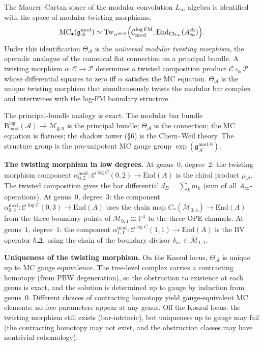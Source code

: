 \documentclass[11pt,reqno]{amsart}
\theoremstyle{definition}
\theoremstyle{remark}
\providecommand{\cA}{\mathcal{A}}
\providecommand{\cC}{\mathcal{C}}
\providecommand{\cM}{\mathcal{M}}
\providecommand{\cP}{\mathcal{P}}
\providecommand{\FM}{\overline{C}}
\providecommand{\gAmod}{\mathfrak{g}^{\mathrm{mod}}_\cA}
\providecommand{\bP}{\mathbb{P}}
\providecommand{\End}{\mathrm{End}}
\numberwithin{equation}{section}
\begin{document}
The Maurer--Cartan space of the modular convolution $L_\infty$
algebra is identified with the space of modular twisting morphisms,
\[
\operatorname{MC}_\bullet(\gAmod)\simeq\operatorname{Tw}_{\alpha^{\mathrm{mod}}}\Bigl(\cC^{\log\mathrm{FM}}_{\mathrm{mod}},\operatorname{End}_{\mathrm{Ch}_\infty}(A^{\mathrm{ch}}_\infty)\Bigr).
\]
Under this identification $\Theta_\cA$ is the \emph{universal modular
twisting morphism}, the operadic analogue of the canonical flat
connection on a principal bundle. A twisting morphism
$\alpha\colon\cC\to\cP$ determines a twisted composition product
$\cC\circ_\alpha\cP$ whose differential squares to zero iff $\alpha$
satisfies the MC equation. $\Theta_\cA$ is the unique twisting
morphism that simultaneously twists the modular bar complex and
intertwines with the log-FM boundary structure.

The principal-bundle analogy is exact. The modular bar bundle
$\mathrm B^{\log}_{\mathrm{mod}}(\cA)\to\overline{\cM}_{g,n}$ is the
principal bundle; $\Theta_\cA$ is the connection; the MC equation is
flatness; the shadow tower (\S6) is the Chern--Weil theory. The
structure group is the pro-unipotent MC gauge group
$\exp(\mathfrak g^{\mathrm{mod},0}_\cA)$.

\medskip
\noindent\textbf{The twisting morphism in low degrees.}\enspace
At genus~$0$, degree~$2$: the twisting morphism component
$\alpha^{\mathrm{mod}}_{0,2}\colon\cC^{\log\FM}(0,2)\to\End(A)$ is the
chiral product $\mu_\cA$. The twisted composition gives the
bar differential $d_B=\sum_k m_k$ (sum of all $A_\infty$-operations).
At genus~$0$, degree~$3$: the component
$\alpha^{\mathrm{mod}}_{0,3}\colon\cC^{\log\FM}(0,3)\to\End(A)$ uses
the chain map $C_*(\overline{\cM}_{0,4})\to\End(A)$ from the three
boundary points of $\overline{\cM}_{0,4}\cong\bP^1$ to the three OPE
channels. At genus~$1$, degree~$1$: the component
$\alpha^{\mathrm{mod}}_{1,1}\colon\cC^{\log\FM}(1,1)\to\End(A)$ is the
BV operator $\hbar\Delta$, using the chain of the boundary divisor
$\delta_{\mathrm{irr}}\in\overline{\cM}_{1,1}$.

\medskip
\noindent\textbf{Uniqueness of the twisting morphism.}\enspace
On the Koszul locus, $\Theta_\cA$ is unique up to MC gauge
equivalence. The tree-level complex carries a contracting homotopy
(from PBW degeneration), so the obstruction to existence at each
genus is exact, and the solution is determined up to gauge by
induction from genus~$0$. Different choices of contracting homotopy
yield gauge-equivalent MC elements; no free parameters appear at
any genus. Off the Koszul locus: the twisting morphism still exists
(bar-intrinsic), but uniqueness up to gauge may fail (the
contracting homotopy may not exist, and the obstruction classes may
have nontrivial cohomology).
\end{document}

